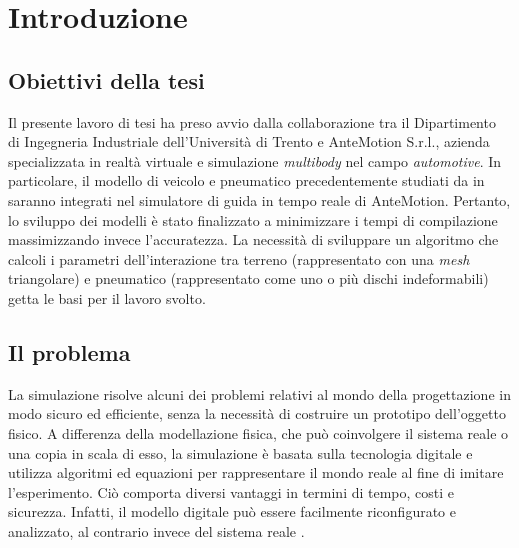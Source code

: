\chapter{Introduzione}
\label{Introduzione}
%
\section{Obiettivi della tesi}
Il presente lavoro di tesi ha preso avvio dalla collaborazione tra il Dipartimento di Ingegneria Industriale dell'Università di Trento e AnteMotion S.r.l., azienda specializzata in realtà virtuale e simulazione \textit{multibody} nel campo \textit{automotive}. In particolare, il modello di veicolo e pneumatico precedentemente studiati da \citeauthor{Larcher} in \cite{Larcher} saranno integrati nel simulatore di guida in tempo reale di AnteMotion. Pertanto, lo sviluppo dei modelli è stato finalizzato a minimizzare i tempi di compilazione massimizzando invece l'accuratezza. La necessità di sviluppare un algoritmo che calcoli i parametri dell'interazione tra terreno (rappresentato con una \textit{mesh} triangolare) e pneumatico (rappresentato come uno o più dischi indeformabili) getta le basi per il lavoro svolto.
%
\section{Il problema}
La simulazione risolve alcuni dei problemi relativi al mondo della progettazione in modo sicuro ed efficiente, senza la necessità di costruire un prototipo dell'oggetto fisico. A differenza della modellazione fisica, che può coinvolgere il sistema reale o una copia in scala di esso, la simulazione è basata sulla tecnologia digitale e utilizza algoritmi ed equazioni per rappresentare il mondo reale al fine di imitare l'esperimento. Ciò comporta diversi vantaggi in termini di tempo, costi e sicurezza. Infatti, il modello digitale può essere facilmente riconfigurato e analizzato, al contrario invece del sistema reale \cite{Anu}.

